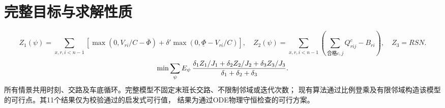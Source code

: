 \documentclass[11pt]{ctexart}
\begin{document}
\section*{完整目标与求解性质}
\[
Z_1(\psi)=\sum_{x,r,i<n-1}[\max(0,V_{ri}/C-\bar\Phi)
+\delta'\max(0,\underline\Phi-V_{ri}/C)],
\quad Z_2(\psi)=\sum_{x,r,i<n-1}(\sum_{\text{合格}c,j}Q^c_{rij}-B_{ri}),\quad Z_3=RSN.
\]
\[
\min\sum_\psi E_\psi\,
{\delta_1Z_1/J_1+\delta_2Z_2/J_2+\delta_3Z_3/J_3\over\delta_1+\delta_2+\delta_3}.
\]
所有情景共用时刻、交路及车底循环。完整模型不固定末班长交路、不限制邻域或迭代次数；
现有算法通过比例登乘及有限邻域构造该模型的可行点。其11个结果仅为校验通过的启发式可行值，
结果为通过ODE物理守恒检查的可行方案。
\end{document}
